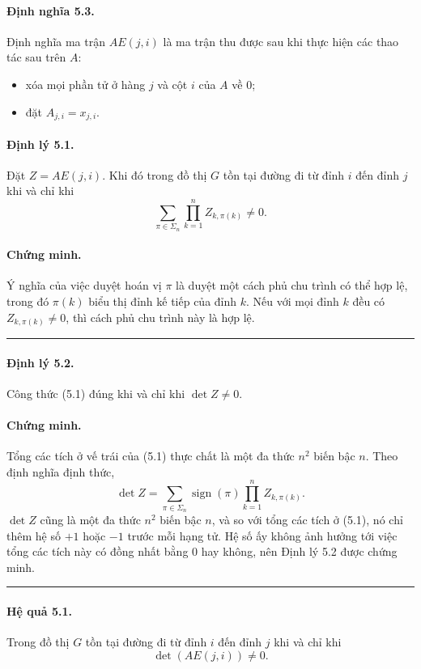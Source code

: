 \documentclass[11pt]{article}
\newcommand{\qedmark}{\hfill\rule{0.7ex}{0.7ex}}
\begin{document}
\paragraph{Định nghĩa 5.3.}
Định nghĩa ma trận \(AE(j,i)\) là ma trận thu được sau khi thực hiện các thao
tác sau trên \(A\):
\begin{itemize}
  \item xóa mọi phần tử ở hàng \(j\) và cột \(i\) của \(A\) về \(0\);

  \item đặt \(A_{j,i}=x_{j,i}\).
\end{itemize}

\paragraph{Định lý 5.1.}
Đặt \(Z=AE(j,i)\). Khi đó trong đồ thị \(G\) tồn tại đường đi từ đỉnh \(i\) đến
đỉnh \(j\) khi và chỉ khi
\[
  \sum_{\pi\in\Sigma_n}\prod_{k=1}^{n} Z_{k,\pi(k)}\ne 0.
  \tag{5.1}
\]

\paragraph{Chứng minh.}
Ý nghĩa của việc duyệt hoán vị \(\pi\) là duyệt một cách phủ chu trình có thể
hợp lệ, trong đó \(\pi(k)\) biểu thị đỉnh kế tiếp của đỉnh \(k\). Nếu với mọi
đỉnh \(k\) đều có \(Z_{k,\pi(k)}\ne 0\), thì cách phủ chu trình này là hợp lệ.
\qedmark

\paragraph{Định lý 5.2.}
Công thức (5.1) đúng khi và chỉ khi \(\det Z\ne 0\).

\paragraph{Chứng minh.}
Tổng các tích ở vế trái của (5.1) thực chất là một đa thức \(n^2\) biến bậc
\(n\). Theo định nghĩa định thức,
\[
  \det Z=\sum_{\pi\in\Sigma_n}\operatorname{sign}(\pi)
  \prod_{k=1}^{n} Z_{k,\pi(k)}.
\]
\(\det Z\) cũng là một đa thức \(n^2\) biến bậc \(n\), và so với tổng các tích
ở (5.1), nó chỉ thêm hệ số \(+1\) hoặc \(-1\) trước mỗi hạng tử. Hệ số ấy
không ảnh hưởng tới việc tổng các tích này có đồng nhất bằng \(0\) hay không,
nên Định lý 5.2 được chứng minh. \qedmark

\paragraph{Hệ quả 5.1.}
Trong đồ thị \(G\) tồn tại đường đi từ đỉnh \(i\) đến đỉnh \(j\) khi và chỉ
khi
\[
  \det(AE(j,i))\ne 0.
\]
\end{document}
